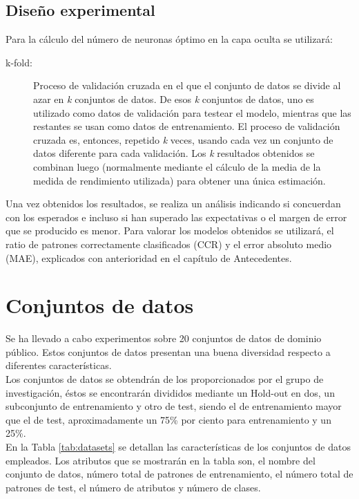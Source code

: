 		\subsection{Diseño experimental}
		
			Para la cálculo del número de neuronas óptimo en la capa oculta se utilizará:
			
			\begin{description}
				\item[k-fold:] Proceso de validación cruzada en el que el conjunto de datos se divide al azar en \textit{k} conjuntos de datos. De esos \textit{k} conjuntos de datos, uno es utilizado como datos de validación para testear el modelo, mientras que las restantes se usan como datos de entrenamiento. El proceso de validación cruzada es, entonces, repetido \textit{k} veces, usando cada vez un conjunto de datos diferente para cada validación. Los \textit{k} resultados obtenidos se combinan luego (normalmente mediante el cálculo de la media de la medida de rendimiento utilizada) para obtener una única estimación.
			\end{description}
			
			Una vez obtenidos los resultados, se realiza un análisis indicando si concuerdan con los esperados e incluso si han superado las expectativas o el margen de error que se producido es menor. Para valorar los modelos obtenidos se utilizará, el ratio de patrones correctamente clasificados (CCR) y el error absoluto medio (MAE), explicados con anterioridad en el capítulo de Antecedentes.
	
	\section{Conjuntos de datos}
		
		Se ha llevado a cabo experimentos sobre 20 conjuntos de datos de dominio público. Estos conjuntos de datos presentan una buena diversidad respecto a diferentes características.\\
		
		Los conjuntos de datos se obtendrán de los proporcionados por el grupo de investigación, éstos se encontrarán divididos mediante un Hold-out en dos, un subconjunto de entrenamiento y otro de test, siendo el de entrenamiento mayor que el de test, aproximadamente un 75\% por ciento para entrenamiento y un 25\%.\\
		
		En la Tabla \ref{tab:datasets} se detallan las características de los conjuntos de datos empleados. Los atributos que se mostrarán en la tabla son, el nombre del conjunto de datos, número total de patrones de entrenamiento, el número total de patrones de test, el número de atributos y número de clases.\\
		
